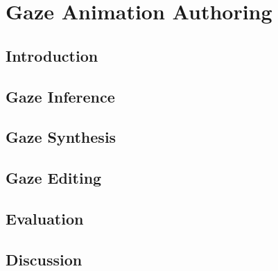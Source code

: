 \pagestyle{deposit}

\chapter{Gaze Animation Authoring}
\label{cha:GazeAuthoring}

\section{Introduction}
\label{sec:GazeAuthoringIntro}


\section{Gaze Inference}
\label{sec:GazeInference}


\section{Gaze Synthesis}
\label{sec:GazeSynthesis}


\section{Gaze Editing}
\label{sec:GazeEditing}


\section{Evaluation}
\label{sec:GazeAuthoringEvaluation}


\section{Discussion}
\label{sec:GazeAuthoringDiscussion}

